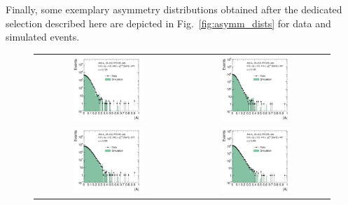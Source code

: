 Finally, some exemplary asymmetry distributions obtained after the dedicated selection described here are depicted in Fig.~\ref{fig:asymm_dists} for data and simulated events. 
\begin{figure}[!tp]
  \centering
  \begin{tabular}{cc}
                \includegraphics[width=0.49\textwidth]{figures/AsymmHistos_Eta0_pt4_alpha1_final_nominal_v4.pdf} &
                \includegraphics[width=0.49\textwidth]{figures/AsymmHistos_Eta0_pt9_alpha1_final_nominal_v4.pdf} \\ 
                \includegraphics[width=0.49\textwidth]{figures/AsymmHistos_Eta0_pt4_alpha5_final_nominal_v4.pdf} &
                \includegraphics[width=0.49\textwidth]{figures/AsymmHistos_Eta0_pt9_alpha5_final_nominal_v4.pdf}

\end{tabular}
\end{figure}
